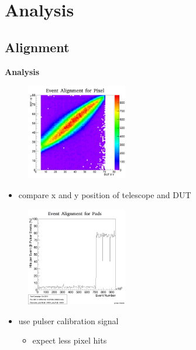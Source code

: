 \documentclass[9pt]{beamer}
\begin{document}
\section{Analysis}
\subsection{Alignment}
\begin{frame}
	\begin{alertblock}{
		\centering
		\Large{\textbf{Analysis}}}
	\end{alertblock}
	\begin{center}
		\begin{minipage}{5.5cm}
			\centering
			\begin{figure}
				\includegraphics[width=4.4cm]{Pics/correlation2y}
			\end{figure}
			\begin{itemize}
				\item compare x and y position of telescope and DUT
			\end{itemize}
		\end{minipage}
		\hspace*{2pt}
		\begin{minipage}{5.5cm}
			\centering
			\begin{figure}
				\includegraphics[width=4.4cm]{Pics/EventAlignment}
			\end{figure}
			\begin{itemize}
				\item use pulser calibration signal
				\begin{itemize}
					\item expect less pixel hits
				\end{itemize}
			\end{itemize}
		\end{minipage}
	\end{center}
\end{frame}
\end{document}
